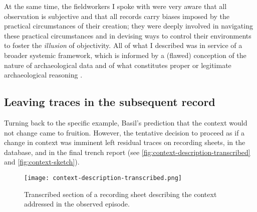 At the same time, the fieldworkers I spoke with were very aware that all observation is subjective and that all records carry biases imposed by the practical circumstances of their creation; they were deeply involved in navigating these practical circumstances and in devising ways to control their environments to foster the \emph{illusion} of objectivity.
All of what I described was in service of a broader systemic framework, which is informed by a (flawed) conception of the nature of archaeological data and of what constitutes proper or legitimate archaeological reasoning \parencite[]{batist-alienation}.


\subsection*{Leaving traces in the subsequent record}
Turning back to the specific example, Basil's prediction that the context would not change came to fruition.
However, the tentative decision to proceed as if a change in context was imminent left residual traces on recording sheets, in the database, and in the final trench report (see \autoref{fig:context-description-transcribed} and \autoref{fig:context-sketch}).


\begin{figure}[H]
  \centering
  \setlength{\fboxsep}{1pt}
  \setlength{\fboxrule}{1pt}
  \texttt{[image: context-description-transcribed.png]}
  \caption{Transcribed section of a recording sheet describing the context addressed in the observed episode.}
  \label{fig:context-description-transcribed}
\end{figure}

